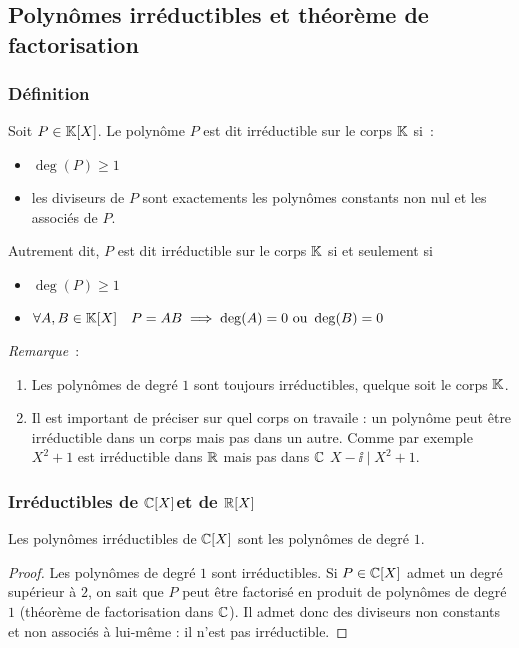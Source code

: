 \subsection{Polynômes irréductibles et théorème de factorisation}

\subsubsection{Définition}

\begin{defdef}
  Soit \(P \in \mathbb{K}[X]\). Le polynôme \(P\) est dit irréductible sur le corps 
  \(\mathbb{K}\) si~:
  \begin{itemize}
    \item \(\deg(P) \geqslant 1\)
    \item les diviseurs de \(P\) sont exactements les polynômes constants non 
      nul et les associés de \(P\).
  \end{itemize}
  Autrement dit, \(P\) est dit irréductible sur le corps \(\mathbb{K}\) si et seulement 
  si
  \begin{itemize}
    \item \(\deg(P) \geqslant 1\)
    \item \(\forall A,B \in \mathbb{K}[X] \quad P=AB \implies \deg(A)=0 \text{~ou~} 
      \deg(B)=0\)
  \end{itemize}
\end{defdef}

\emph{Remarque}~:
\begin{enumerate}
  \item Les polynômes de degré \(1\) sont toujours irréductibles, quelque soit 
    le corps \(\mathbb{K}\).
  \item Il est important de préciser sur quel corps on travaile : un polynôme 
    peut être irréductible dans un corps mais pas dans un autre. Comme par 
    exemple \(X^2+1\) est irréductible dans \(\mathbb{R}\) mais pas dans \(\mathbb{C}\) 
    \(X-\ii\mid{}X^2+1\).
\end{enumerate}

\subsubsection{Irréductibles de \(\mathbb{C}[X]\)et de \(\mathbb{R}[X]\)}

\begin{prop}
  Les polynômes irréductibles de \(\mathbb{C}[X]\) sont les polynômes de degré \(1\).
\end{prop}
\begin{proof}
  Les polynômes de degré \(1\) sont irréductibles. Si \(P\in \mathbb{C}[X]\) admet un 
  degré supérieur à \(2\), on sait que \(P\) peut être factorisé en produit de 
  polynômes de degré \(1\) (théorème de factorisation dans \(\mathbb{C}\)). Il admet 
  donc des diviseurs non constants et non associés à lui-même : il n'est pas 
  irréductible.
\end{proof}

